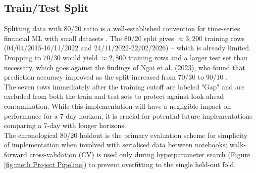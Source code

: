 \subsection{Train/Test Split}
Splitting data with 80/20 ratio is a well-established convention for time-series financial ML with small datasets \cite{kurniasariHybridARIMAANNModel2025, oladeleDeepNeuralNetwork2023}. The 80/20 split gives $\approx 3,200$ training rows (04/04/2015-16/11/2022 and 24/11/2022-22/02/2026) – which is already limited. Dropping to 70/30 would yield $\approx 2,800$ training rows and a larger test set than necessary, which goes against the findings of Ngai et al. (2023), who found that prediction accuracy improved as the split increased from 70/30 to 90/10 \cite{eddiengaiTimeSeriesPrediction2023}.\\
The seven rows immediately after the training cutoff are labeled "Gap" and are excluded from both the train and test sets to protect against look-ahead contamination. While this implementation will have a negligible impact on performance for a 7-day horizon, it is crucial for potential future implementations comparing a 7-day with longer horizons.\\
The chronological 80/20 holdout is the primary evaluation scheme for simplicity of implementation when involved with serialised data between notebooks; walk-forward cross-validation (CV) is used only during hyperparameter search (Figure \ref{fig:meth Project Pipeline}) to prevent overfitting to the single held-out fold.
